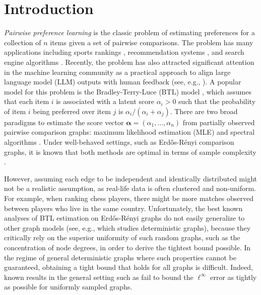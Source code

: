 \documentclass[sigconf,nonacm,pbalance]{acmart}
\newcommand{\ifracB}[2]{{{#1}/{(#2)}}}
\begin{document}
\section{Introduction}
\emph{Pairwise preference learning} is the classic problem of estimating preferences for a collection of $n$ items given a set of pairwise comparisons. The problem has many applications including sports rankings \cite{Elo1978}, recommendation systems \cite{BaltrunasMakcinskasRicci2010}, and search engine algorithms \cite{PageBrinMotwaniWinograd1999}. Recently, the problem has also attracted significant attention in the machine learning community as a practical approach to align large language model (LLM) outputs with human feedback (see, e.g., \cite{ChristianoLeikeBrown2017,OuyangWuJiang2022}). A popular model for this problem is the Bradley-Terry-Luce (BTL) model \cite{BradleyTerry1952,Luce1959,Plackett1975,Zermelo1929}, which assumes that each item $i$ is associated with a latent score $\alpha_i > 0$ such that the probability of item $i$ being preferred over item $j$ is $\ifracB{\alpha_i}{\alpha_i+\alpha_j}$.
There are two broad paradigms to estimate the score vector 
$\bm{\alpha}=(\alpha_1,\dots,\alpha_n)$ from partially observed pairwise comparison graphs: maximum likelihood estimation (MLE) \cite{Ford1957,Hunter2004,Shahetal2016} and spectral algorithms \cite{NegahbanOhShah2017, JadbabaieMakurShah2020,SpectralonGeneralMultiway,JadbabaieMakurShah2024}. Under well-behaved settings, such as Erd\H{o}s-R\'{e}nyi comparison graphs, it is known that both methods are optimal in terms of sample complexity \cite{Chenetal2019}.

However, assuming each edge to be independent and identically distributed might not be a realistic assumption, as real-life data is often clustered and non-uniform. For example, when ranking chess players, there might be more matches observed between players who live in the same country. Unfortunately, the best known analyses of BTL estimation on Erd\H{o}s-R\'{e}nyi graphs do not easily generalize to other graph models (see, e.g., \cite{Shahetal2016} which studies deterministic graphs), because they critically rely on the superior uniformity of such random graphs, such as the concentration of node degrees, in order to derive the tightest bound possible. In the regime of general deterministic graphs where such properties cannot be guaranteed, obtaining a tight bound that holds for all graphs is difficult. Indeed, known results in the general setting such as \cite{RankingGeneralGraphsLocality,LiShrotriyaRinaldo2022} fail to bound the $\ell^\infty$ error as tightly as possible for uniformly sampled graphs.
\end{document}
